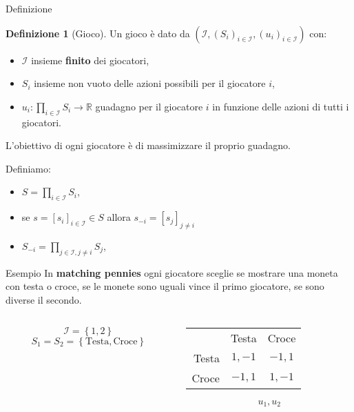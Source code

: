 \documentclass{beamer}
\newcounter{counter1}
\theoremstyle{plain}
\theoremstyle{definition}
\newtheorem{mydef}[counter1]{Definizione}
\theoremstyle{remark}
\newcommand{\set}[1]{\left\{#1\right\}}
\newcommand{\pa}[1]{\left(#1\right)}
\newcommand{\bra}[1]{\left[#1\right]}
\begin{document}
\begin{frame}{Definizione}
  \begin{mydef}[Gioco]%
    Un gioco è dato da $\pa{\mathcal{I},\pa{S_i}_{i\in\mathcal{I}},
      \pa{u_i}_{i\in\mathcal{I}}}$ con:
    \begin{itemize}
    \item $\mathcal{I}$ insieme \textbf{finito} dei giocatori,
    \item $S_i$ insieme non vuoto delle azioni possibili per il
      giocatore $i$,
    \item $u_i: \prod _{i\in\mathcal{I}} S_i \to \mathbb{R}$ guadagno
      per il giocatore $i$ in funzione delle azioni di tutti i
      giocatori.
    \end{itemize}
  \end{mydef}
  L'obiettivo di ogni giocatore è di massimizzare il proprio guadagno.

  Definiamo:
  \begin{itemize}
  \item $S = \prod _{i\in\mathcal{I}} S_i$,
  \item se $s = \bra{s_i}_{i\in\mathcal{I}} \in S$ allora $s_{-i} =
    \bra{s_j}_{j\neq i}$
  \item $\displaystyle S_{-i} = \prod _{j\in\mathcal{I},j\neq i} S_j$,
  \end{itemize}
\end{frame}

\begin{frame}{Esempio}
  In \textbf{matching pennies} ogni giocatore sceglie se mostrare una
  moneta con testa o croce, se le monete sono uguali vince il primo
  giocatore, se sono diverse il secondo.
  
  \begin{columns}[T]
    \begin{column}{0.4\textwidth}
      \[ \mathcal{I} = \set{1,2} \]
      \[ S_1 = S_2 = \set{\text{Testa},\text{Croce}} \]
    \end{column}
    \begin{column}{0.4\textwidth}
      \begin{tabular}{rcc}
        & Testa & Croce \\
        \cline{2-3}
        Testa & \multicolumn{1}{|c|}{$1,-1$} & \multicolumn{1}{|c|}{$-1,1$}  \\
        \cline{2-3}
        Croce & \multicolumn{1}{|c|}{$-1,1$} & \multicolumn{1}{|c|}{$1,-1$}  \\
        \cline{2-3}
      \end{tabular}
      \[ u_1,u_2 \]
    \end{column}
  \end{columns}
\end{frame}
\end{document}
